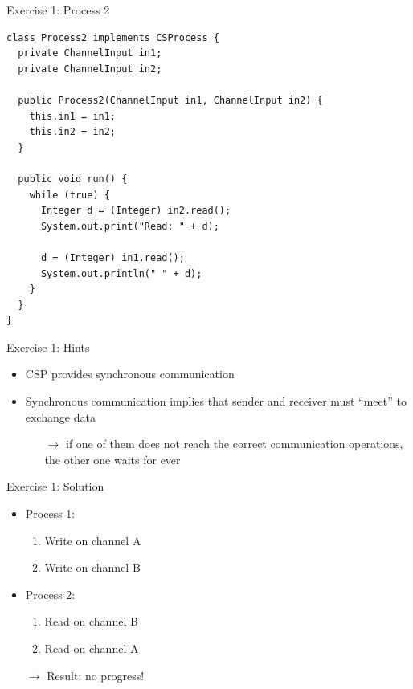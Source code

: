 \begin{frame}[fragile]{Exercise 1: Process 2}
\begin{lstlisting}[basicstyle=\fontsize{9}{11}\selectfont\ttfamily]
class Process2 implements CSProcess {
  private ChannelInput in1;
  private ChannelInput in2;

  public Process2(ChannelInput in1, ChannelInput in2) {
    this.in1 = in1;
    this.in2 = in2;
  }

  public void run() {
    while (true) {
      Integer d = (Integer) in2.read();
      System.out.print("Read: " + d);

      d = (Integer) in1.read();
      System.out.println(" " + d);
    }
  }
}
\end{lstlisting}
\end{frame}

\begin{frame}{Exercise 1: Hints}
  \begin{itemize}
  \item CSP provides synchronous communication
  \item Synchronous communication implies that sender and receiver
    must ``meet'' to exchange data
    \begin{itemize}
    \item[$\rightarrow$] if one of them does not reach the correct
      communication operations, the other one waits for ever
    \end{itemize}
  \end{itemize}
\end{frame}

\begin{frame}{Exercise 1: Solution}
  \begin{itemize}
  \item Process 1:
    \begin{enumerate}
    \item Write on channel A
    \item Write on channel B
    \end{enumerate}
  \item Process 2:
    \begin{enumerate}
    \item Read on channel B
    \item Read on channel A
    \end{enumerate}
  \item[$\rightarrow$] Result: no progress!
  \end{itemize}
\end{frame}

